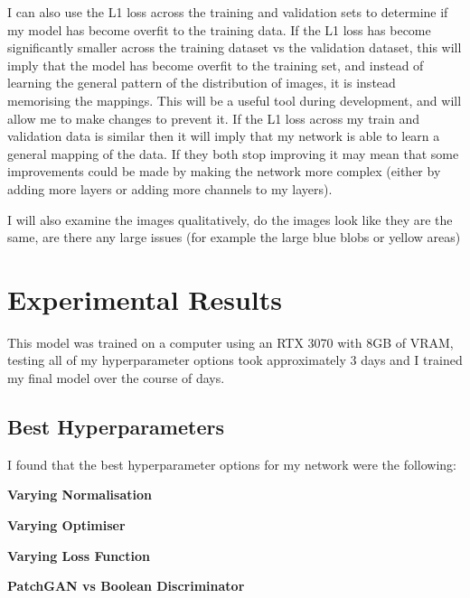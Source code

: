 \documentclass[11pt]{article}
\begin{document}
I can also use the L1 loss across the training and validation sets to determine if my model has become overfit to the training data. If the L1 loss has become significantly smaller across the training dataset vs the validation dataset, this will imply that the model has become overfit to the training set, and instead of learning the general pattern of the distribution of images, it is instead memorising the mappings. This will be a useful tool during development, and will allow me to make changes to prevent it. If the L1 loss across my train and validation data is similar then it will imply that my network is able to learn a general mapping of the data. If they both stop improving it may mean that some improvements could be made by making the network more complex (either by adding more layers or adding more channels to my layers). 

I will also examine the images qualitatively, do the images look like they are the same, are there any large issues (for example the large blue blobs or yellow areas)

\newpage{}

\section{Experimental Results}



This model was trained on a computer using an RTX 3070 with 8GB of VRAM, testing all of my hyperparameter options took approximately 3 days and I trained my final model over the course of 
days.

\subsection{Best Hyperparameters}
I found that the best hyperparameter options for my network were the following:


\textbf{Varying Normalisation}

\textbf{Varying Optimiser}

\textbf{Varying Loss Function}

\textbf{PatchGAN vs Boolean Discriminator}
\end{document}
